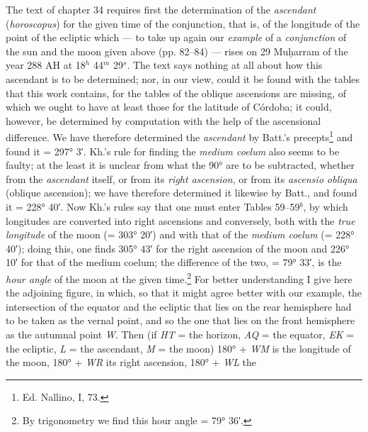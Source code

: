 \documentclass[11pt]{article}
\newcommand{\Pg}[1]{\marginpar{\footnotesize\color{gray}#1}}
\begin{document}
\par \Pg{93}The text of chapter 34 requires first the determination of the \emph{ascendant} (\emph{horoscopus}) for the given time of the conjunction, that is, of the longitude of the point of the ecliptic which — to take up again our \emph{example} of a \emph{conjunction} of the sun and the moon given above (pp. 82–84) — rises on 29 Muḥarram of the year 288 AH at 18$^{h}$ 44$^{m}$ 29$^{s}$. The text says nothing at all about how this ascendant is to be determined; nor, in our view, could it be found with the tables that this work contains, for the tables of the oblique ascensions are missing, of which we ought to have at least those for the latitude of Córdoba; it could, however, be determined by computation with the help of the ascensional difference. We have therefore determined the \emph{ascendant} by Batt.'s precepts\footnote{Ed. Nallino, I, 73.} and found it = 297° 3′. Kh.'s rule for finding the \emph{medium coelum} also seems to be faulty; at the least it is unclear from what the 90° are to be subtracted, whether from the \emph{ascendant} itself, or from its \emph{right ascension}, or from its \emph{ascensio obliqua} (oblique ascension); we have therefore determined it likewise by Batt., and found it = 228° 40′. Now Kh.'s rules say that one must enter Tables 59–59$^{b}$, by which longitudes are converted into right ascensions and conversely, both with the \emph{true longitude} of the moon (= 303° 20′) and with that of the \emph{medium coelum} (= 228° 40′); doing this, one finds 305° 43′ for the right ascension of the moon and 226° 10′ for that of the medium coelum; the difference of the two, = 79° 33′, is the \emph{hour angle} of the moon at the given time.\footnote{By trigonometry we find this hour angle = 79° 36′.} For better understanding I give here the adjoining figure, in which, so that it might agree better with our example, the intersection of the equator and the ecliptic that lies on the rear hemisphere had to be taken as the vernal point, and so the one that lies on the front hemisphere as the autumnal point \emph{W}. Then (if \emph{HT} = the horizon, \emph{AQ} = the equator, \emph{EK} = the ecliptic, \emph{L} = the ascendant, \emph{M} = the moon) 180° + \emph{WM} is the longitude of the moon, 180° + \emph{WR} its right ascension, 180° + \emph{WL} the 
\end{document}
